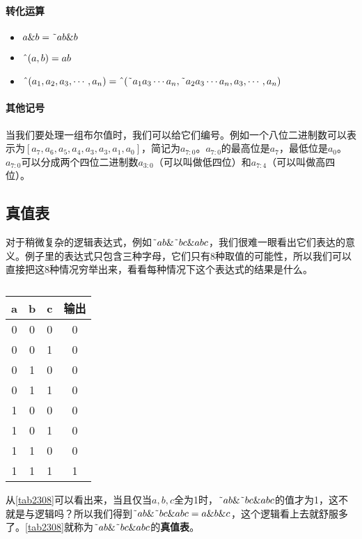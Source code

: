 \paragraph*{转化运算}
\begin{itemize}
\item $a\&b=\textrm{\~{}} ab\&b$
\item $\textrm{\^{}}(a,b)=ab$
\item $\textrm{\^{}}(a_1,a_2,a_3,\cdots,a_n)=\textrm{\^{}}(\textrm{\~{}} a_1a_3\cdots a_n,\textrm{\~{}} a_2a_3\cdots a_n,a_3,\cdots,a_n)$
\end{itemize}

\paragraph*{其他记号}
当我们要处理一组布尔值时，我们可以给它们编号。例如一个八位二进制数可以表示为$[a_7,a_6,a_5,a_4,a_3,a_3,a_1,a_0]$，简记为$a_{7:0}$。$a_{7:0}$的最高位是$a_7$，最低位是$a_0$。$a_{7:0}$可以分成两个四位二进制数$a_{3:0}$（可以叫做低四位）和$a_{7:4}$（可以叫做高四位）。

\subsection{真值表}
对于稍微复杂的逻辑表达式，例如$\textrm{\~{}}ab\&\textrm{\~{}}bc\&abc$，我们很难一眼看出它们表达的意义。例子里的表达式只包含三种字母，它们只有8种取值的可能性，所以我们可以直接把这8种情况穷举出来，看看每种情况下这个表达式的结果是什么。

\begin{table}[!h]
\centering
\begin{tabular}{cccc}
a&b&c&输出\\\hline
0&0&0&0\\\hline
0&0&1&0\\\hline
0&1&0&0\\\hline
0&1&1&0\\\hline
1&0&0&0\\\hline
1&0&1&0\\\hline
1&1&0&0\\\hline
1&1&1&1
\end{tabular}
\caption{}\label{tab2308}
\end{table}

从\autoref{tab2308}可以看出来，当且仅当$a,b,c$全为1时，$\textrm{\~{}}ab\&\textrm{\~{}}bc\&abc$的值才为1，这不就是与逻辑吗？所以我们得到$\textrm{\~{}}ab\&\textrm{\~{}}bc\&abc=a\&b\&c$，这个逻辑看上去就舒服多了。\autoref{tab2308}就称为$\textrm{\~{}}ab\&\textrm{\~{}}bc\&abc$的\textbf{真值表}。

